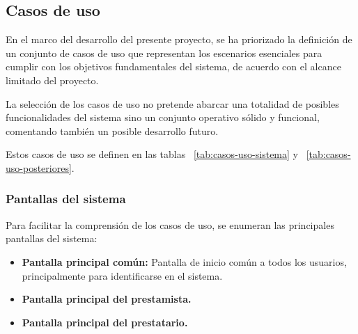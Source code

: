 \subsection{Casos de uso}

En el marco del desarrollo del presente proyecto, 
se ha priorizado la definición de un conjunto de casos de uso que representan 
los escenarios esenciales para cumplir con los objetivos fundamentales del 
sistema, de acuerdo con el alcance limitado del proyecto.

La selección de los casos de uso  no pretende abarcar una totalidad 
de posibles funcionalidades del sistema sino un conjunto operativo sólido y 
funcional, comentando también un posible desarrollo futuro.

Estos casos de uso se definen en las tablas ~\ref{tab:casos-uso-sistema} y 
~\ref{tab:casos-uso-posteriores}.

\subsubsection{Pantallas del sistema}
Para facilitar la comprensión de los casos de uso, se enumeran las principales
pantallas del sistema:

\begin{itemize}
    \item \textbf{Pantalla principal común:} Pantalla de inicio común a todos los
    usuarios, principalmente para identificarse en el sistema.
    \item \textbf{Pantalla principal del prestamista.}
    \item \textbf{Pantalla principal del prestatario.}
\end{itemize}

